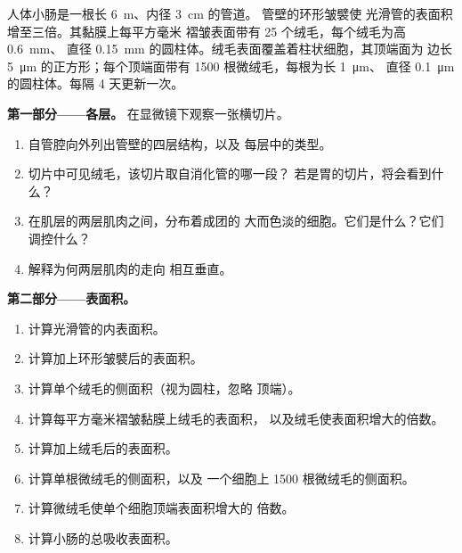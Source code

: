 \begin{problem}
\label{pb:b1:body-plans-tissues:1}
人体小肠是一根长 \qty{6}{m}、内径 \qty{3}{cm} 的管道。
管壁的环形皱襞使
光滑管的表面积增至三倍。其黏膜上每平方毫米
褶皱表面带有 \qty{25}{} 个绒毛，每个绒毛为高 \qty{0.6}{mm}、
直径 \qty{0.15}{mm} 的圆柱体。绒毛表面覆盖着柱状细胞，其顶端面为
边长 \qty{5}{\micro m} 的正方形；每个顶端面带有
\qty{1500}{} 根微绒毛，每根为长 \qty{1}{\micro m}、
直径 \qty{0.1}{\micro m} 的圆柱体。每隔
\qty{4}{} 天更新一次。

\medskip
\noindent\textbf{第一部分——各层。}
在显微镜下观察一张横切片。
\begin{enumerate}
  \item 自管腔向外列出管壁的四层结构，以及
        每层中的类型。
  \item 切片中可见绒毛，该切片取自消化管的哪一段？
        若是胃的切片，将会看到什么？
  \item 在肌层的两层肌肉之间，分布着成团的
        大而色淡的细胞。它们是什么？它们调控什么？
  \item 解释为何两层肌肉的走向
        相互垂直。
\end{enumerate}

\medskip
\noindent\textbf{第二部分——表面积。}
\begin{enumerate}[resume]
  \item 计算光滑管的内表面积。
  \item 计算加上环形皱襞后的表面积。
  \item 计算单个绒毛的侧面积（视为圆柱，忽略
        顶端）。
  \item 计算每平方毫米褶皱黏膜上绒毛的表面积，
        以及绒毛使表面积增大的倍数。
  \item 计算加上绒毛后的表面积。
  \item 计算单根微绒毛的侧面积，以及
        一个细胞上 \qty{1500}{} 根微绒毛的侧面积。
  \item 计算微绒毛使单个细胞顶端表面积增大的
        倍数。
  \item 计算小肠的总吸收表面积。
\end{enumerate}


\end{problem}
